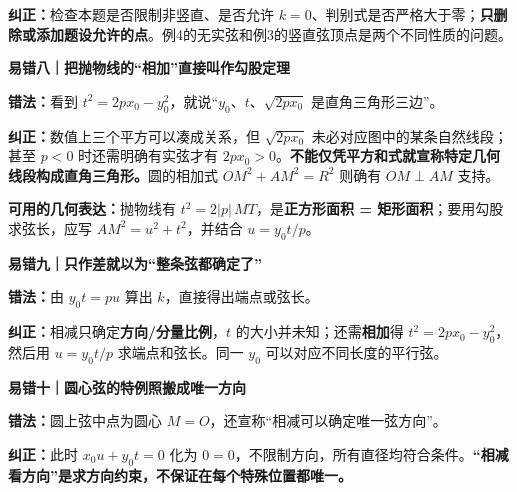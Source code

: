 \begin{trapbox}
\par\noindent\textbf{纠正：}检查本题是否限制非竖直、是否允许 $k=0$、判别式是否严格大于零；\textbf{只删除或添加题设允许的点}。例4的无实弦和例3的竖直弦顶点是两个不同性质的问题。

\par\medskip
\begin{minipage}{\linewidth}
\noindent
\textbf{\textcolor{CTrap}{易错八｜把抛物线的“相加”直接叫作勾股定理}}\par\nobreak\smallskip
\par\noindent\textbf{错法：}看到 $t^2=2px_0-y_0^2$，就说“$y_0$、$t$、$\sqrt{2px_0}$ 是直角三角形三边”。\par
\end{minipage}
\par

\par\noindent\textbf{纠正：}数值上三个平方可以凑成关系，但 $\sqrt{2px_0}$ 未必对应图中的某条自然线段；甚至 $p<0$ 时还需明确有实弦才有 $2px_0>0$。\textbf{不能仅凭平方和式就宣称特定几何线段构成直角三角形。}圆的相加式 $OM^2+AM^2=R^2$ 则确有 $OM\perp AM$ 支持。
\par\noindent\textbf{可用的几何表达：}抛物线有 $t^2=2|p|\,MT$，是\textbf{正方形面积 = 矩形面积}；要用勾股求弦长，应写 $AM^2=u^2+t^2$，并结合 $u=y_0t/p$。
\par\medskip
\begin{minipage}{\linewidth}
\noindent
\textbf{\textcolor{CTrap}{易错九｜只作差就以为“整条弦都确定了”}}\par\nobreak\smallskip
\par\noindent\textbf{错法：}由 $y_0t=pu$ 算出 $k$，直接得出端点或弦长。\par
\end{minipage}
\par

\par\noindent\textbf{纠正：}相减只确定\textbf{方向/分量比例}，$t$ 的大小并未知；还需\textbf{相加}得 $t^2=2px_0-y_0^2$，然后用 $u=y_0t/p$ 求端点和弦长。同一 $y_0$ 可以对应不同长度的平行弦。
\par\medskip
\begin{minipage}{\linewidth}
\noindent
\textbf{\textcolor{CTrap}{易错十｜圆心弦的特例照搬成唯一方向}}\par\nobreak\smallskip
\par\noindent\textbf{错法：}圆上弦中点为圆心 $M=O$，还宣称“相减可以确定唯一弦方向”。\par
\end{minipage}
\par

\par\noindent\textbf{纠正：}此时 $x_0u+y_0t=0$ 化为 $0=0$，不限制方向，所有直径均符合条件。\textbf{“相减看方向”是求方向约束，不保证在每个特殊位置都唯一。}

\end{trapbox}
